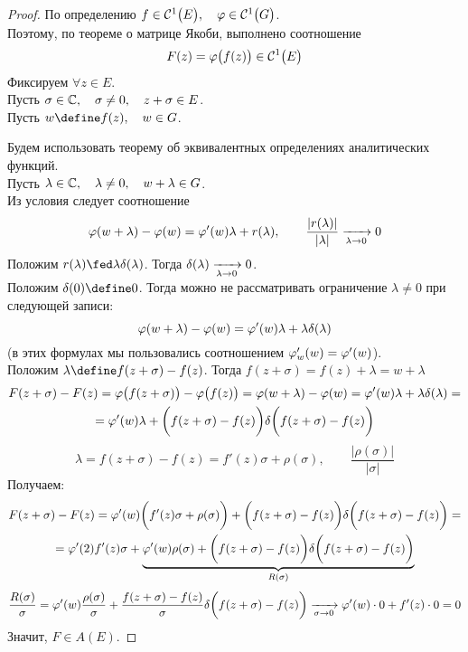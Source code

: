 \begin{proof}
	По определению $ f \in \Cont[1] E, \quad \vphi \in \Cont[1]G $. \\
	Поэтому, по теореме о матрице Якоби, выполнено соотношение
	$$ F(z) = \vphi \big( f(z) \big) \in \Cont[1]E $$
	Фиксируем $ \forall z \in E $. \\
	Пусть $ \sigma \in \Co, \quad \sigma \ne 0, \quad z + \sigma \in E $. \\
	Пусть $ w \define f(z), \quad w \in G $.

	Будем использовать теорему об эквивалентных определениях аналитических функций. \\
	Пусть $ \lambda \in \Co, \quad \lambda \ne 0, \quad w + \lambda \in G $. \\
	Из условия следует соотношение
	$$ \vphi(w + \lambda) - \vphi(w) = \vphi'(w) \lambda + r(\lambda), \qquad \frac{|r(\lambda)|}{|\lambda|} \underarr{\lambda \to 0} 0 $$
	Положим $ r(\lambda) \fed \lambda \delta(\lambda) $. Тогда $ \delta(\lambda) \underarr{\lambda \to 0} 0 $. \\
	Положим $ \delta(0) \define 0 $. Тогда можно не рассматривать ограничение $ \lambda \ne 0 $ при следующей записи:
	$$ \vphi(w + \lambda) - \vphi(w) = \vphi'(w)\lambda + \lambda \delta(\lambda) $$
	(в этих формулах мы пользовались соотношением $ \vphi_w'(w) = \vphi'(w) $). \\
	Положим $ \lambda \define f(z + \sigma) - f(z) $. Тогда $ f(z + \sigma) = f(z) + \lambda = w + \lambda $
	\begin{multline*}
		F(z + \sigma) - F(z) = \vphi \big( f(z + \sigma) \big) - \vphi \big( f(z) \big) = \vphi(w + \lambda) - \vphi(w) = \vphi'(w) \lambda + \lambda \delta(\lambda) = \\
		= \vphi'(w)\lambda + \bigg( f(z + \sigma) - f(z) \bigg) \delta \bigg( f(z + \sigma) - f(z) \bigg)
	\end{multline*}
	$$ \lambda = f(z + \sigma) - f(z) = f'(z)\sigma + \rho(\sigma), \qquad \frac{|\rho(\sigma)|}{|\sigma|} $$
	Получаем:
	\begin{multline*}
		F(z + \sigma) - F(z) = \vphi'(w) \bigg( f'(z) \sigma + \rho(\sigma) \bigg) + \bigg( f(z + \sigma) - f(z) \bigg) \delta \bigg( f(z + \sigma) - f(z) \bigg) = \\
		= \vphi'(2)f'(z) \sigma + \underbrace{\vphi'(w)\rho(\sigma) + \bigg( f(z + \sigma) - f(z) \bigg) \delta \bigg( f(z + \sigma) - f(z) \bigg)}_{R(\sigma)}
	\end{multline*}
	$$ \frac{R(\sigma)}\sigma = \vphi'(w) \frac{\rho(\sigma)}\sigma + \frac{f(z + \sigma) - f(z)}\sigma \delta \bigg( f(z + \sigma) - f(z) \bigg) \underarr{\sigma \to 0} \vphi'(w) \cdot 0 + f'(z) \cdot 0 = 0 $$
	Значит, $ F \in A(E) $.
\end{proof}

